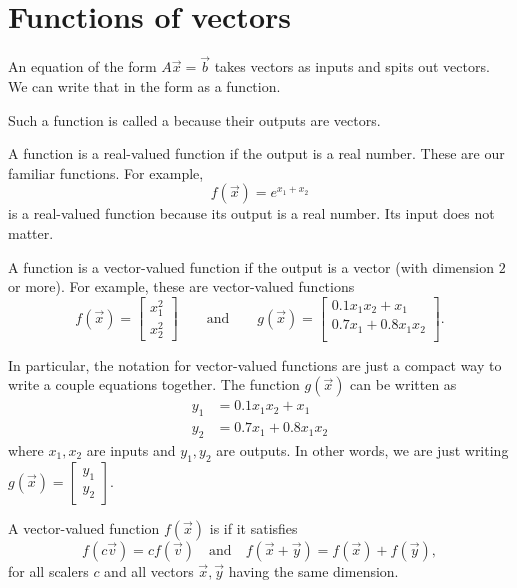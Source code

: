 \documentclass[../main.tex]{subfiles}
\begin{document}
 \section{Functions of vectors}

An equation of the form \(A \vec{x} = \vec{b}\) takes vectors as inputs and spits out vectors. We can write that in the form as a function.

Such a function is called a  because their outputs are vectors.  

A function is a real-valued function if the output is a real number. These are our familiar functions.  For example, 
\[
  f(\vec{x}) = e^{x_{1} + x_{2}}
\]
is a real-valued function because its output is a real number. Its input does not matter. 

A function is a vector-valued function if the output is a vector (with dimension \(2\) or more). For example, these are vector-valued functions
\[
  f(\vec{x}) = 
  \begin{bmatrix}
    x_{1}^{2} \\
    x_{2}^{2}
  \end{bmatrix} 
  \qquad\text{and}\qquad
  g(\vec{x}) = 
  \begin{bmatrix}
    0.1 x_{1} x_{2} + x_{1} \\
    0.7 x_{1} + 0.8 x_{1} x_{2} \\
  \end{bmatrix}.
\]

In particular, the notation for vector-valued functions are just a compact way to write a couple equations together. The function \(g(\vec{x})\) can be written as 
\begin{align*}
  y_{1} &= 0.1 x_{1} x_{2} + x_{1} \\
  y_{2} &= 0.7 x_{1} + 0.8 x_{1} x_{2}
\end{align*}
where \(x_{1}, x_{2}\) are inputs and \(y_{1}, y_{2}\) are outputs. In other words, we are just writing \(g(\vec{x}) = \begin{bmatrix} y_{1} \\ y_{2} \end{bmatrix}\).

\faStar{} A vector-valued function \(f(\vec{x})\) is  if it satisfies 
\begin{equation}
  f(c \vec{v}) = c f(\vec{v})
  \quad\text{and}\quad
  f(\vec{x} + \vec{y}) = f(\vec{x}) + f(\vec{y}),
\end{equation}
for all scalers \(c\) and all vectors \(\vec{x}, \vec{y}\) having the same dimension.
\end{document}
